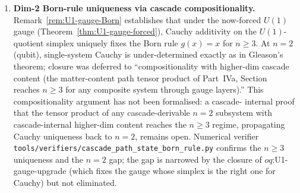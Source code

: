 \documentclass[12pt,a4paper]{article}
\begin{document}
\begin{enumerate}
hypothesis of Section~1). Earlier ``both gauges cascade-consistent''
framing in Remarks~\ref{rem:U1-gauge-Born} and~\ref{rem:U1-gauge-J} is
superseded.
\item \textbf{Dim-2 Born-rule uniqueness via cascade compositionality.}\label{oq:dim2-born-uniqueness}
Remark~\ref{rem:U1-gauge-Born} establishes that under the now-forced
$U(1)$ gauge (Theorem~\ref{thm:U1-gauge-forced}), Cauchy additivity
on the $U(1)$-quotient simplex uniquely fixes the Born rule
$g(x) = x$ for $n \geq 3$. At $n = 2$ (qubit), single-system Cauchy
is under-determined exactly as in Gleason's theorem; closure was
deferred to ``compositionality with higher-dim cascade content
(the matter-content path tensor product of Part~IVa, Section~
reaches $n \geq 3$ for any composite system through gauge layers).''
This compositionality argument has not been formalised: a cascade-
internal proof that the tensor product of any cascade-derivable
$n = 2$ subsystem with cascade-internal higher-dim content reaches
the $n \geq 3$ regime, propagating Cauchy uniqueness back to $n = 2$,
remains open. Numerical verifier
\texttt{tools/verifiers/cascade\_path\_state\_born\_rule.py}
confirms the $n \geq 3$ uniqueness and the $n = 2$ gap; the gap is
narrowed by the closure of $oq$:U1-gauge-upgrade (which fixes the
gauge whose simplex is the right one for Cauchy) but not eliminated.
\end{enumerate}
\end{document}
